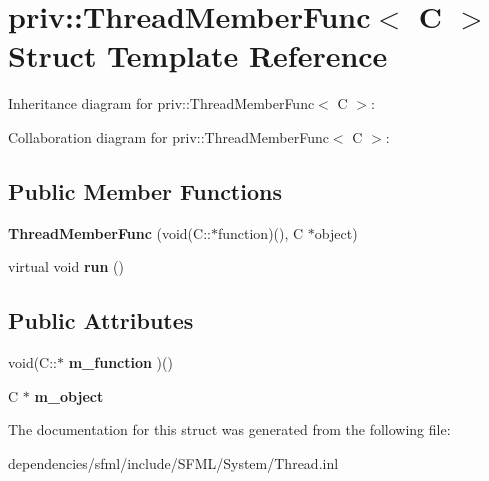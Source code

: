 \hypertarget{structpriv_1_1_thread_member_func}{}\section{priv\+:\+:Thread\+Member\+Func$<$ C $>$ Struct Template Reference}
\label{structpriv_1_1_thread_member_func}


Inheritance diagram for priv\+:\+:Thread\+Member\+Func$<$ C $>$\+:


Collaboration diagram for priv\+:\+:Thread\+Member\+Func$<$ C $>$\+:
\subsection*{Public Member Functions}
\begin{DoxyCompactItemize}
\item 
\mbox{\label{structpriv_1_1_thread_member_func_ae44619c4cf6d886da6f32a1de37d652e}} 
{\bfseries Thread\+Member\+Func} (void(C\+::$\ast$function)(), C $\ast$object)
\item 
\mbox{\label{structpriv_1_1_thread_member_func_abbd440e93edf2747cf9cdde579bc5de0}} 
virtual void {\bfseries run} ()
\end{DoxyCompactItemize}
\subsection*{Public Attributes}
\begin{DoxyCompactItemize}
\item 
\mbox{\label{structpriv_1_1_thread_member_func_a2b3e753f87b70ae3ad1c4ff54a995fe8}} 
void(C\+::$\ast$ {\bfseries m\+\_\+function} )()
\item 
\mbox{\label{structpriv_1_1_thread_member_func_a849dd2e31c95e699fb316065d9d75116}} 
C $\ast$ {\bfseries m\+\_\+object}
\end{DoxyCompactItemize}


The documentation for this struct was generated from the following file\+:\begin{DoxyCompactItemize}
\item 
dependencies/sfml/include/\+S\+F\+M\+L/\+System/Thread.\+inl\end{DoxyCompactItemize}
